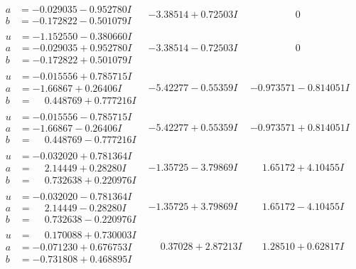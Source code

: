 \documentclass[1p]{elsarticle_modified}
\theoremstyle{definition}
\begin{document}
$$\begin{array}{c|c|c}
\begin{aligned}
a &= -0.029035 - 0.952780 I \\
b &= -0.172822 - 0.501079 I\end{aligned}
 & -3.38514 + 0.72503 I & \phantom{-0.000000 } 0 \\ \hline\begin{aligned}
u &= -1.152550 - 0.380660 I \\
a &= -0.029035 + 0.952780 I \\
b &= -0.172822 + 0.501079 I\end{aligned}
 & -3.38514 - 0.72503 I & \phantom{-0.000000 } 0 \\ \hline\begin{aligned}
u &= -0.015556 + 0.785715 I \\
a &= -1.66867 + 0.26406 I \\
b &= \phantom{-}0.448769 + 0.777216 I\end{aligned}
 & -5.42277 - 0.55359 I & -0.973571 - 0.814051 I \\ \hline\begin{aligned}
u &= -0.015556 - 0.785715 I \\
a &= -1.66867 - 0.26406 I \\
b &= \phantom{-}0.448769 - 0.777216 I\end{aligned}
 & -5.42277 + 0.55359 I & -0.973571 + 0.814051 I \\ \hline\begin{aligned}
u &= -0.032020 + 0.781364 I \\
a &= \phantom{-}2.14449 + 0.28280 I \\
b &= \phantom{-}0.732638 + 0.220976 I\end{aligned}
 & -1.35725 - 3.79869 I & \phantom{-}1.65172 + 4.10455 I \\ \hline\begin{aligned}
u &= -0.032020 - 0.781364 I \\
a &= \phantom{-}2.14449 - 0.28280 I \\
b &= \phantom{-}0.732638 - 0.220976 I\end{aligned}
 & -1.35725 + 3.79869 I & \phantom{-}1.65172 - 4.10455 I \\ \hline\begin{aligned}
u &= \phantom{-}0.170088 + 0.730003 I \\
a &= -0.071230 + 0.676753 I \\
b &= -0.731808 + 0.468895 I\end{aligned}
 & \phantom{-}0.37028 + 2.87213 I & \phantom{-}1.28510 + 0.62817 I \\ \hline\begin{aligned}

\end{aligned}
\end{array}$$
\end{document}
